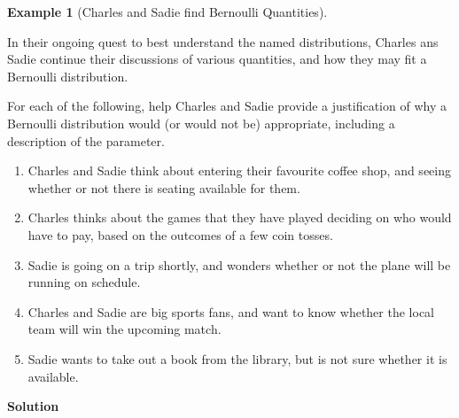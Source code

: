 \documentclass[
  letterpaper,
  DIV=11,
  numbers=noendperiod]{scrreprt}
\providecommand{\tightlist}{%
  \setlength{\itemsep}{0pt}\setlength{\parskip}{0pt}}\usepackage{longtable,booktabs,array}
\theoremstyle{definition}
\theoremstyle{definition}
\newtheorem{example}{Example}[chapter]
\theoremstyle{definition}
\theoremstyle{remark}
\begin{document}
\begin{example}[Charles and Sadie find Bernoulli
Quantities]\protect\hypertarget{exm-bernoulli}{}\label{exm-bernoulli}

In their ongoing quest to best understand the named distributions,
Charles ans Sadie continue their discussions of various quantities, and
how they may fit a Bernoulli distribution.

For each of the following, help Charles and Sadie provide a
justification of why a Bernoulli distribution would (or would not be)
appropriate, including a description of the parameter.

\begin{enumerate}
\def\labelenumi{\alph{enumi}.}
\tightlist
\item
  Charles and Sadie think about entering their favourite coffee shop,
  and seeing whether or not there is seating available for them.
\item
  Charles thinks about the games that they have played deciding on who
  would have to pay, based on the outcomes of a few coin tosses.
\item
  Sadie is going on a trip shortly, and wonders whether or not the plane
  will be running on schedule.
\item
  Charles and Sadie are big sports fans, and want to know whether the
  local team will win the upcoming match.
\item
  Sadie wants to take out a book from the library, but is not sure
  whether it is available.
\end{enumerate}

\begin{tcolorbox}[enhanced jigsaw, colback=white, colframe=quarto-callout-color-frame, arc=.35mm, leftrule=.75mm, rightrule=.15mm, opacityback=0, breakable, bottomrule=.15mm, left=2mm, toprule=.15mm]

\vspace{-3mm}\textbf{Solution}\vspace{3mm}


\end{tcolorbox}
\end{example}
\end{document}
